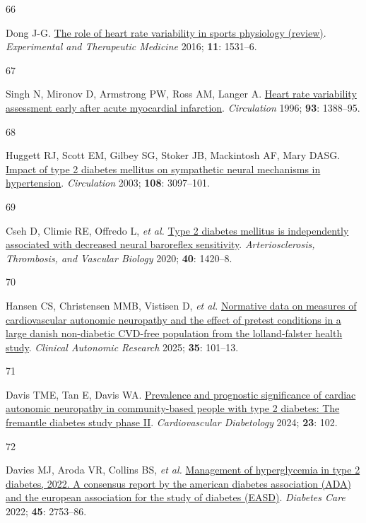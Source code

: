 \documentclass[
  a4paper,
  headsepline=true,
  open=left]{scrbook}
\newlength{\cslhangindent}
\newlength{\csllabelwidth}
\newlength{\cslentryspacingunit} %
\newenvironment{CSLReferences}[2] %
 {%
  \setlength{\parindent}{0pt}
  \ifodd #1
  \let\oldpar\par
  \def\par{\hangindent=\cslhangindent\oldpar}
  \fi
  \setlength{\parskip}{#2\cslentryspacingunit}
 }%
 {}
\newcommand{\CSLLeftMargin}[1]{\parbox[t]{\csllabelwidth}{#1}}
\newcommand{\CSLRightInline}[1]{\parbox[t]{\linewidth - \csllabelwidth}{#1}\break}
\begin{document}
\begin{CSLReferences}{0}{0}
\leavevmode{}%
\CSLLeftMargin{66 }%
\CSLRightInline{Dong J-G.
\href{https://doi.org/10.3892/etm.2016.3104}{The role of heart rate
variability in sports physiology (review)}. \emph{Experimental and
Therapeutic Medicine} 2016; \textbf{11}: 1531--6.}

\leavevmode{}%
\CSLLeftMargin{67 }%
\CSLRightInline{Singh N, Mironov D, Armstrong PW, Ross AM, Langer A.
\href{https://doi.org/10.1161/01.CIR.93.7.1388}{Heart rate variability
assessment early after acute myocardial infarction}. \emph{Circulation}
1996; \textbf{93}: 1388--95.}

\leavevmode{}%
\CSLLeftMargin{68 }%
\CSLRightInline{Huggett RJ, Scott EM, Gilbey SG, Stoker JB, Mackintosh
AF, Mary DASG.
\href{https://doi.org/10.1161/01.CIR.0000103123.66264.FE}{Impact of type
2 diabetes mellitus on sympathetic neural mechanisms in hypertension}.
\emph{Circulation} 2003; \textbf{108}: 3097--101.}

\leavevmode{}%
\CSLLeftMargin{69 }%
\CSLRightInline{Cseh D, Climie RE, Offredo L, \emph{et al.}
\href{https://doi.org/10.1161/ATVBAHA.120.314102}{Type 2 diabetes
mellitus is independently associated with decreased neural baroreflex
sensitivity}. \emph{Arteriosclerosis, Thrombosis, and Vascular Biology}
2020; \textbf{40}: 1420--8.}

\leavevmode{}%
\CSLLeftMargin{70 }%
\CSLRightInline{Hansen CS, Christensen MMB, Vistisen D, \emph{et al.}
\href{https://doi.org/10.1007/s10286-024-01069-6}{Normative data on
measures of cardiovascular autonomic neuropathy and the effect of
pretest conditions in a large danish non-diabetic CVD-free population
from the lolland-falster health study}. \emph{Clinical Autonomic
Research} 2025; \textbf{35}: 101--13.}

\leavevmode{}%
\CSLLeftMargin{71 }%
\CSLRightInline{Davis TME, Tan E, Davis WA.
\href{https://doi.org/10.1186/s12933-024-02185-3}{Prevalence and
prognostic significance of cardiac autonomic neuropathy in
community-based people with type 2 diabetes: The fremantle diabetes
study phase II}. \emph{Cardiovascular Diabetology} 2024; \textbf{23}:
102.}

\leavevmode{}%
\CSLLeftMargin{72 }%
\CSLRightInline{Davies MJ, Aroda VR, Collins BS, \emph{et al.}
\href{https://doi.org/10.2337/dci22-0034}{Management of hyperglycemia in
type 2 diabetes, 2022. A consensus report by the american diabetes
association (ADA) and the european association for the study of diabetes
(EASD)}. \emph{Diabetes Care} 2022; \textbf{45}: 2753--86.}


\end{CSLReferences}
\end{document}
